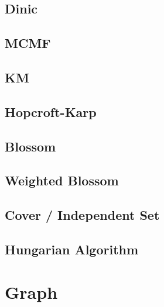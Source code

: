 \documentclass[a4paper,10pt,twocolumn,oneside,x11names]{article}
\begin{document}
\subsection{Dinic}


%

\subsection{MCMF}


\subsection{KM}


\subsection{Hopcroft-Karp}


\subsection{Blossom}


\subsection{Weighted Blossom}


\subsection{Cover / Independent Set}


\subsection{Hungarian Algorithm}



\section{Graph}
\end{document}
